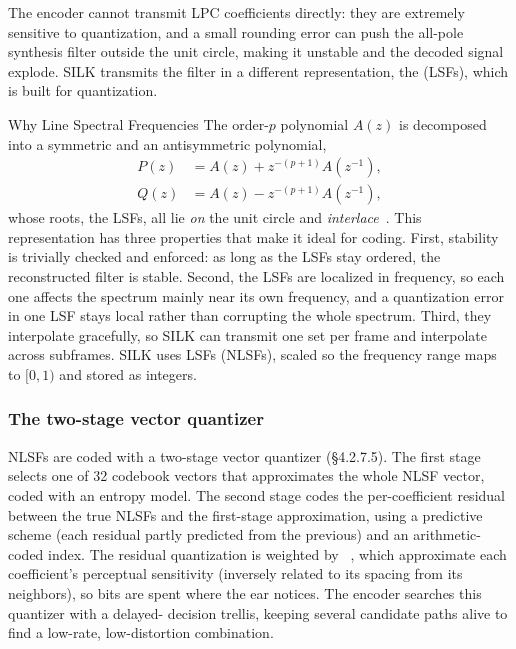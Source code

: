 The encoder cannot transmit LPC coefficients directly: they are extremely
sensitive to quantization, and a small rounding error can push the all-pole
synthesis filter outside the unit circle, making it unstable and the decoded
signal explode. SILK transmits the filter in a different representation, the
 (LSFs), which is built for quantization.

\begin{concept}{Why Line Spectral Frequencies}
  The order-$p$ polynomial $A(z)$ is decomposed into a symmetric and an
  antisymmetric polynomial,
  \begin{align}
    P(z) &= A(z) + z^{-(p+1)} A(z^{-1}), \\
    Q(z) &= A(z) - z^{-(p+1)} A(z^{-1}),
  \end{align}
  whose roots, the LSFs, all lie \emph{on} the unit circle and
  \emph{interlace}~\cite{itakura1975line}. This representation has three
  properties that make it ideal for coding. First, stability is trivially
  checked and enforced: as long as the LSFs stay ordered, the reconstructed
  filter is stable. Second, the LSFs are localized in frequency, so each one
  affects the spectrum mainly near its own frequency, and a
  quantization error in
  one LSF stays local rather than corrupting the whole spectrum. Third, they
  interpolate gracefully, so SILK can transmit one set per frame and interpolate
  across subframes. SILK uses  LSFs (NLSFs), scaled so the
  frequency range maps to $[0, 1)$ and stored as  integers.
\end{concept}

\subsubsection{The two-stage vector quantizer}

NLSFs are coded with a two-stage vector quantizer (\S4.2.7.5). The first stage
selects one of 32 codebook vectors that approximates the whole NLSF vector,
coded with an entropy model. The second stage codes the per-coefficient residual
between the true NLSFs and the first-stage approximation, using a predictive
scheme (each residual partly predicted from the previous) and an
arithmetic-coded
index. The residual quantization is weighted by ~\cite{laroia1991robust}, which approximate each
coefficient's perceptual
sensitivity (inversely related to its spacing from its neighbors), so bits are
spent where the ear notices. The encoder searches this quantizer with a delayed-
decision trellis, keeping several candidate paths alive to find a low-rate,
low-distortion combination.


